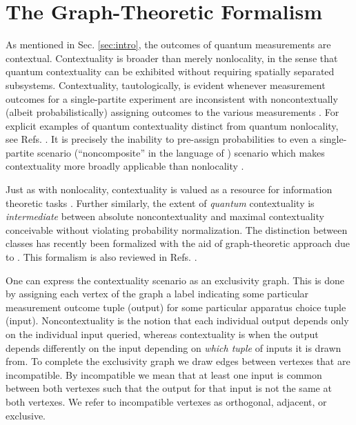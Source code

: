 \documentclass[
  12pt          %
  ,letterpaper  %
  ,center       %
  ,noupper      %
  ,english,fleqn]{uconnthesis}
\let\stdsection\section
\renewcommand\section{\newpage\stdsection}
\begin{document}
\section{The Graph-Theoretic Formalism}
As mentioned in Sec. \ref{sec:intro}, the outcomes of quantum measurements are contextual. Contextuality is broader than merely nonlocality, in the sense that quantum contextuality can be exhibited without requiring spatially separated subsystems. Contextuality, tautologically, is evident whenever measurement outcomes for a single-partite experiment are inconsistent with noncontextually (albeit probabilistically) assigning outcomes to the various measurements \cite{MerminContextuality,PreperationContextuality}. For explicit examples of quantum contextuality distinct from quantum nonlocality, see Refs. \cite{SpekkensSeer,Pentagrams,ExperimentalContextuality,ks18,CSWNew,BellAndNonContextualInequalities,KCBS,contextualitycircle}. It is precisely the inability to pre-assign probabilities to even a single-partite scenario (``noncomposite'' in the language of \citet{TwoQubitsSeparabilityContextuality}) scenario which makes contextuality more broadly applicable than nonlocality \cite{BellAndNonContextualInequalities,ContextualityLeggettGarg}.

Just as with nonlocality, contextuality is valued as a resource for information theoretic tasks \cite{naturecompeditorial,emersoncontextuality}. Further similarly, the extent of \emph{quantum} contextuality is \emph{intermediate} between absolute noncontextuality and maximal contextuality conceivable without violating probability normalization. The distinction between classes has recently been formalized with the aid of graph-theoretic approach due to \citet*{CSWOld}. This formalism is also reviewed in Refs. \cite{EPOriginal,FritzCombinatorialLong,CSWNew}. 

One can express the contextuality scenario as an exclusivity graph. This is done by assigning each vertex of the graph a label indicating some particular measurement outcome tuple (output) for some particular apparatus choice tuple (input). Noncontextuality is the notion that each individual output depends only on the individual input queried, whereas contextuality is when the output depends differently on the input depending on {\em which tuple} of inputs it is drawn from. To complete the exclusivity graph we draw edges between vertexes that are incompatible. By incompatible we mean that at least one input is common between both vertexes such that the output for that input is not the same at both vertexes. We refer to incompatible vertexes as orthogonal, adjacent, or exclusive. 
\end{document}
